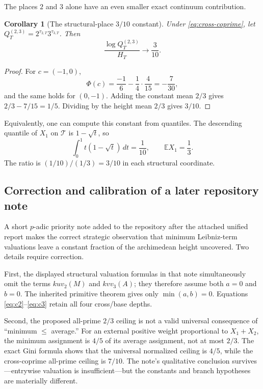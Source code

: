 \documentclass[11pt,oneside]{article}
\newtheorem{corollary}[theorem]{Corollary}
\theoremstyle{definition}
\theoremstyle{remark}
\newcommand{\DeltaTri}{\mathcal T}
\begin{document}
The places $2$ and $3$ alone have an even smaller exact continuum contribution.

\begin{corollary}[The structural-place $3/10$ constant]\label{cor:three-tenths}
Under \eqref{eq:cross-coprime}, let
$Q_T^{(2,3)}=2^{\tau_{2,T}}3^{\tau_{3,T}}$.  Then
\begin{equation}\label{eq:three-tenths}
  \frac{\log Q_T^{(2,3)}}{H_T}\longrightarrow\frac3{10}.
\end{equation}
\end{corollary}

\begin{proof}
For $c=(-1,0)$,
\[
 \Phi(c)=\frac{-1}{6}-\frac14\cdot\frac4{15}=-\frac7{30},
\]
and the same holds for $(0,-1)$.  Adding the constant mean $2/3$ gives
$2/3-7/15=1/5$.  Dividing by the height mean $2/3$ gives $3/10$.
\end{proof}

Equivalently, one can compute this constant from quantiles.  The descending quantile of
$X_1$ on $\DeltaTri$ is $1-\sqrt t$, so
\[
 \int_0^1t(1-\sqrt t)\,dt=\frac1{10},
 \qquad
 \mathbb EX_1=\frac13.
\]
The ratio is $(1/10)/(1/3)=3/10$ in each structural coordinate.

\subsection{Correction and calibration of a later repository note}

A short $p$-adic priority note added to the repository after the attached unified report makes
the correct strategic observation that minimum Leibniz-term valuations leave a constant
fraction of the archimedean height uncovered.  Two details require correction.

First, the displayed structural valuation formulas in that note simultaneously omit the
terms $kuv_2(M)$ and $kvv_3(A)$; they therefore assume both $a=0$ and $b=0$.  The inherited
primitive theorem gives only $\min(a,b)=0$.  Equations
\eqref{eq:c2}--\eqref{eq:c3} retain all four cross/base depths.

Second, the proposed all-prime $2/3$ ceiling is not a valid universal consequence of
``minimum $\le$ average.''  For an external positive weight proportional to $X_1+X_2$, the
minimum assignment is $4/5$ of its average assignment, not at most $2/3$.  The exact Gini
formula shows that the universal normalized ceiling is $4/5$, while the cross-coprime
all-prime ceiling is $7/10$.  The note's qualitative conclusion survives---entrywise
valuation is insufficient---but the constants and branch hypotheses are materially different.
\end{document}
